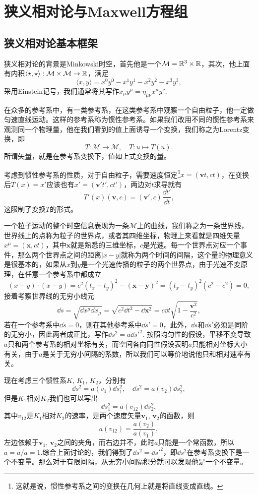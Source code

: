 \documentclass[9pt]{extbook}
\begin{document}
\mainmatter
\chapter{狭义相对论与Maxwell方程组}
\section{狭义相对论基本框架}
狭义相对论的背景是Minkowski时空，首先他是一个$\mathcal{M}=\mathbb{R}^{3}\times \mathbb{R}$，其次，他上面有内积$\langle\star,\star\rangle:\mathcal{M}\times \mathcal{M}\to \mathbb{R}$，满足
\[
	\langle x,y\rangle=x^0y^0-x^1y^1-x^2y^2-x^3y^3,
\]
采用Einstein记号，我们通常将其写作$x_\mu y^\mu=\eta_{\mu\nu}x^\mu y^\nu$.

在众多的参考系中，有一类参考系，在这类参考系中观察一个自由粒子，他一定做匀速直线运动。这样的参考系称为惯性参考系。如果我们改用不同的惯性参考系来观测同一个物理量，他在我们看到的值上面诱导一个变换，我们称之为Lorentz变换，即
\[
	T:\mathcal{M}\to \mathcal{M},\quad T:u\mapsto T(u).
\]
所谓矢量，就是在参考系变换下，值如上式变换的量。

考虑到惯性参考系的性质，对于自由粒子，需要速度恒定\footnote{这就是说，惯性参考系之间的变换在几何上就是将直线变成直线。}$x=(\bm{v}t,ct)$，在变换后$T(x)=x'$应该也有$x'=(\bm{v}'t',ct')$，两边对$t$求导就有
\begin{equation}
	T'(x)(\bm{v},c)=(\bm{v}',c)\frac{\dd t'}{\dd t},
	\label{1}
\end{equation}
这限制了变换$T$的形式。

一个粒子运动的整个时空信息表现为一条$\mathcal{M}$上的曲线，我们称之为一条世界线，世界线上的点称为粒子的世界点，或者其四维坐标，物理上来看就是四维矢量$x^\mu=(\bm{x},ct)$，其中$\bm{x}$就是熟悉的三维坐标，$c$是光速。每一个世界点对应一个事件，那么两个世界点之间的距离$|x-y|$就称为两个时间的间隔，这个量的物理意义是很基本的，如果从$x$到$y$是一个光速传播的粒子的两个世界点，由于光速不变原理，在任意一个参考系中都成立
\[
	(x-y)\cdot (x-y)=c^2(t_x-t_y)^2-(\bm{x-y})^2=(t_x-t_y)^2(c^2-c^2)=0,
\]
接着考察世界线的无穷小线元
\[
	\dd s=\sqrt{\dd x^\mu\dd x_\mu}=\sqrt{c^2\dd t^2-\dd \bm{x}^2}=c\dd t \sqrt{1-\frac{\bm{v}^2}{c^2}},
\]
若在一个参考系中$\dd s=0$，则在其他参考系中$\dd s'=0$，此外，$\dd s$和$\dd s'$必须是同阶的无穷小，因此两者成正比，写作$\dd s^2=a\dd s'^2$.
按照均匀性的假设，平移不变导致$a$只和两个参考系的相对坐标有关，而空间各向同性假设表明$a$只能相对坐标大小有关，由于$a$是关于无穷小间隔的系数，所以我们可以等价地说他只和相对速率有关。

现在考虑三个惯性系$K$, $K_1$, $K_2$，分别有
\[
	\dd s^2=a(v_1)\dd s_1^2,\quad \dd s^2=a(v_2)\dd s_2^2,
\]
但是$K_1$相对$K_2$我们也可以写出
\[
	\dd s_1^2=a(v_{12})\dd s_2^2,
\]
其中$v_{12}$是$K_1$相对$K_2$的速率，是两个速度矢量$\bm{v}_1$, $\bm{v}_2$的函数，则
\[
	a(v_{12})=\frac{a(v_2)}{a(v_1)},
\]
左边依赖于$\bm{v}_1$, $\bm{v}_2$之间的夹角，而右边并不，此时$a$只能是一个常函数，所以$a=a/a=1$.综合上面讨论的，我们得到了$\dd s^2=\dd s'^2$，即$\dd s^2$在参考系变换下是一个不变量。那么对于有限间隔，从无穷小间隔积分就可以发现他是一个不变量。
\end{document}

